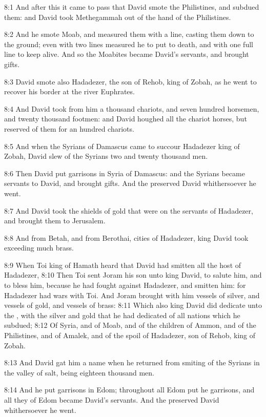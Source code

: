 8:1 And after this it came to pass that David smote the Philistines, and subdued them: and David took Methegammah out of the hand of the Philistines.

8:2 And he smote Moab, and measured them with a line, casting them down to the ground; even with two lines measured he to put to death, and with one full line to keep alive. And so the Moabites became David's servants, and brought gifts.

8:3 David smote also Hadadezer, the son of Rehob, king of Zobah, as he went to recover his border at the river Euphrates.

8:4 And David took from him a thousand chariots, and seven hundred horsemen, and twenty thousand footmen: and David houghed all the chariot horses, but reserved of them for an hundred chariots.

8:5 And when the Syrians of Damascus came to succour Hadadezer king of Zobah, David slew of the Syrians two and twenty thousand men.

8:6 Then David put garrisons in Syria of Damascus: and the Syrians became servants to David, and brought gifts. And the \LORD preserved David whithersoever he went.

8:7 And David took the shields of gold that were on the servants of Hadadezer, and brought them to Jerusalem.

8:8 And from Betah, and from Berothai, cities of Hadadezer, king David took exceeding much brass.

8:9 When Toi king of Hamath heard that David had smitten all the host of Hadadezer, 8:10 Then Toi sent Joram his son unto king David, to salute him, and to bless him, because he had fought against Hadadezer, and smitten him: for Hadadezer had wars with Toi. And Joram brought with him vessels of silver, and vessels of gold, and vessels of brass: 8:11 Which also king David did dedicate unto the \LORD, with the silver and gold that he had dedicated of all nations which he subdued; 8:12 Of Syria, and of Moab, and of the children of Ammon, and of the Philistines, and of Amalek, and of the spoil of Hadadezer, son of Rehob, king of Zobah.

8:13 And David gat him a name when he returned from smiting of the Syrians in the valley of salt, being eighteen thousand men.

8:14 And he put garrisons in Edom; throughout all Edom put he garrisons, and all they of Edom became David's servants. And the \LORD preserved David whithersoever he went.

